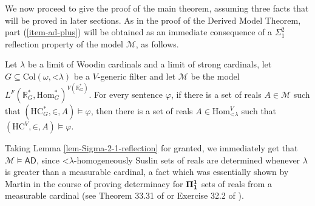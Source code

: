 \documentclass[fleqn, 11pt]{amsart}
\theoremstyle{plain}
\theoremstyle{definition}
\theoremstyle{remark}
\newcommand{\Hom}{\mathrm{Hom}}
\newcommand{\bfPi}{\bf{\Pi}}
\newcommand{\HC}{\mathrm{HC}}
\newcommand{\AD}{\mathsf{AD}}
\newcommand{\Col}{\mathrm{Col}}
\newcommand{\restrict}{\mathord{\restriction}}
\DeclareMathOperator{\p}{p}
\begin{document}
We now proceed to give the proof of the main theorem, assuming three facts that will be proved in later sections. As in the proof of the Derived Model Theorem, part (\ref{item-ad-plus}) will be obtained as an immediate consequence of a $\Sigma^2_1$ reflection property of the model $\mathcal{M}$, as follows.


\begin{lem*}[\ref{lem-Sigma-2-1-reflection}]
 Let $\lambda$ be a limit of Woodin cardinals and a limit of strong cardinals,  let $G \subseteq \Col(\omega,\mathord{<}\lambda)$ be a $V$-generic filter and let 
 $\mathcal{M}$ be the model $L^F(\mathbb{R}^*_G, \Hom^*_G)^{V(\mathbb{R}^*_G)}$.
 For every sentence $\varphi$, if there is a set of reals $A\in \mathcal{M}$ such that $(\HC^*_G,\mathord{\in},A) \models \varphi$, then there is a set of reals $A \in \Hom_{\mathord{<}\lambda}^V$ such that $(\HC^{V},\mathord{\in},A) \models \varphi$.
\end{lem*}


Taking Lemma \ref{lem-Sigma-2-1-reflection}
for granted, we
immediately get that $\mathcal{M} \models \AD$, since $\mathord{<}\lambda$-homogeneously Suslin sets of reals are determined whenever $\lambda$ is greater than a measurable cardinal, a fact which  was essentially shown by Martin in the course of proving determinacy for $\bfPi^1_1$ sets of reals from a measurable cardinal (see Theorem 33.31 of \cite{Jec2002} or Exercise 32.2 of \cite{KanHigherInfinite}).
\end{document}

